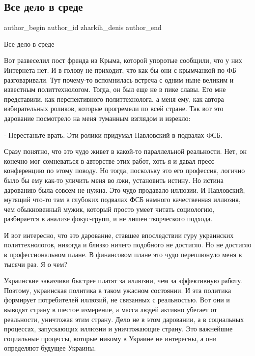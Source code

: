  
 
 
 
 
 
\subsection{Все дело в среде}
\label{sec:29_12_2015.fb.zharkih_denis.1.vse_delo_v_srede}
 
\ifcmt
 author_begin
   author_id zharkih_denis
 author_end
\fi

Все дело в среде

Вот развеселил пост френда из Крыма, которой упоротые сообщили, что у них
Интернета нет. И в голову не приходит, что как бы они с крымчанкой по ФБ
разговаривали. Тут почему-то вспомнилась встреча с одним ныне великим и
известным политтехнологом. Тогда, он был еще не в пике славы. Его мне
представили, как перспективного политтехнолога, а меня ему, как автора
избирательных роликов, которые прогремели по всей стране. Так вот это дарование
посмотрело на меня туманным взглядом и изрекло:

- Перестаньте врать. Эти ролики придумал Павловский в подвалах ФСБ. 

Сразу понятно, что это чудо живет в какой-то параллельной реальности. Нет, он
конечно мог сомневаться в авторстве этих работ, хоть я и давал
пресс-конференцию по этому поводу. Но тогда, поскольку это его профессия,
логично было бы ему как-то уличить меня во лжи, установить истину. Но истина
дарованию была совсем не нужна. Это чудо продавало иллюзии. И Павловский,
мутящий что-то там в глубоких подвалах ФСБ намного качественная иллюзия, чем
обыкновенный мужик, который просто умеет читать социологию, разбирается в
анализе фокус-групп, и не лишен творческого подхода. 

И вот интересно, что это дарование, ставшее впоследствии гуру украинских
политтехнологов, никогда и близко ничего подобного не достигло. Но не достигло
в профессиональном плане. В финансовом плане это чудо переплюнуло меня в тысячи
раз.  Я о чем? 

Украинские заказчики быстрее платят за иллюзии, чем за эффективную работу.
Поэтому, украинская политика в таком ужасном состоянии. И эта политика
формирует потребителей иллюзий, не связанных с реальностью. Вот они и выводят
страну в шестое измерение, а  масса людей активно убегает от реальности,
уничтожая этим страну.  Дело не в  этом даровании, а в социальных процессах,
запускающих иллюзии и уничтожающие страну. Это важнейшие социальные процессы,
которые никому в Украине не интересны, а они определяют будущее Украины.
